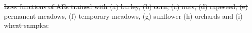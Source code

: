 \documentclass[journal,article,submit,pdftex,moreauthors]{Definitions/mdpi}
\providecommand{\DIFdel}[1]{{\protect\color{red}\sout{#1}}}                      %
\providecommand{\DIFdelend}{} %
\providecommand{\DIFdelFL}[1]{\DIFdel{#1}} %
\begin{document}
{%
}
{%
}
{%
}
{%
\DIFdelFL{Loss functions of AEs trained with (a) barley, (b) corn, (c) nuts, (d) rapeseed, (e) permanent meadows, (f) temporary meadows, (g) sunflower (h) orchards and (i) wheat samples.}}
\DIFdelend %
\end{document}
